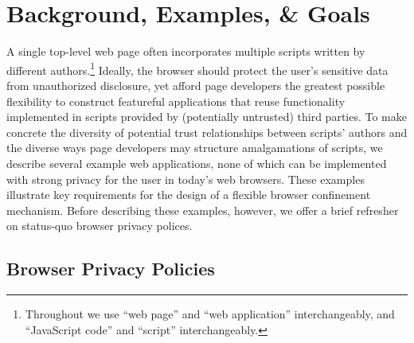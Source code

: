 \section{Background, Examples, \& Goals}

A single top-level web page often incorporates multiple scripts
written by different authors.\footnote{Throughout we use ``web page''
  and ``web application'' interchangeably, and ``JavaScript code'' and
  ``script'' interchangeably.} Ideally, the browser should protect the
user's sensitive data from unauthorized disclosure, yet afford page
developers the greatest possible flexibility to construct %
featureful applications that reuse functionality implemented in
scripts provided by (potentially untrusted) third parties. To make
concrete the diversity of potential trust relationships between
scripts' authors and the diverse ways page developers may structure
amalgamations of scripts, we describe several example web
applications, none of which can be implemented with strong privacy for
the user in today's web browsers. These examples illustrate key
requirements for the design of a flexible browser confinement
mechanism. Before describing these examples, however, we offer a brief
refresher on status-quo browser privacy polices.

\subsection{Browser Privacy Policies}
\label{sec:backgd}

